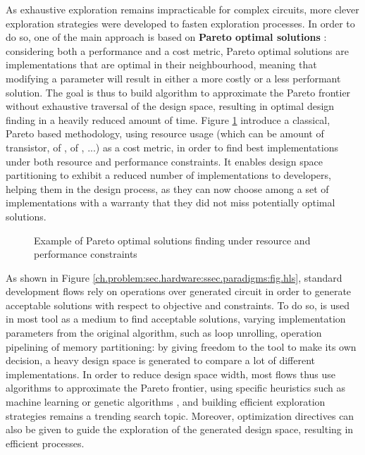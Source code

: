     As exhaustive exploration remains impracticable for complex circuits, more clever exploration strategies were developed to fasten exploration processes. 
    In order to do so, one of the main approach is based on {\bf Pareto optimal solutions} \cite{schafer_high-level_2020}: considering both a performance and a cost metric, Pareto optimal solutions are implementations that are optimal in their neighbourhood, meaning that modifying a parameter will result in either a more costly or a less performant solution.
    The goal is thus to build algorithm to approximate the Pareto frontier without exhaustive traversal of the design space, resulting in optimal design finding in a heavily reduced amount of time.
    Figure \ref{ch.problem:sec.dse:ssec.definitions:fig.pareto} introduce a classical, Pareto based  methodology, using resource usage (which can be amount of transistor, of , of , ...) as a cost metric, in order to find best implementations under both resource and performance constraints. 
    It enables design space partitioning to exhibit a reduced number of implementations to developers, helping them in the design process, as they can now choose among a set of implementations with a warranty that they did not miss potentially optimal solutions.

    \begin{figure}[h!]
        \centering
        
        \caption[Pareto frontier representation]{Example of Pareto optimal solutions finding under resource and\\performance constraints}
        \label{ch.problem:sec.dse:ssec.definitions:fig.pareto}
    \end{figure}

    As shown in Figure \ref{ch.problem:sec.hardware:ssec.paradigms:fig.hls}, standard  development flows rely on  operations over generated circuit in order to generate acceptable solutions with respect to objective and constraints.
    To do so,  is used in most  tool as a medium to find acceptable solutions, varying implementation parameters from the original algorithm, such as loop unrolling, operation pipelining of memory partitioning: by giving freedom to the tool to make its own decision, a heavy design space is generated to compare a lot of different implementations.
    In order to reduce design space width, most flows thus use algorithms to approximate the Pareto frontier, using specific heuristics such as machine learning \cite{nardi_practical_2019} \cite{ferretti_leveraging_2020} or genetic algorithms \cite{manuel_model-based_2020}, and building efficient exploration strategies remains a trending search topic.
    Moreover, optimization directives can also be given to guide the exploration of the generated design space, resulting in efficient  processes.

